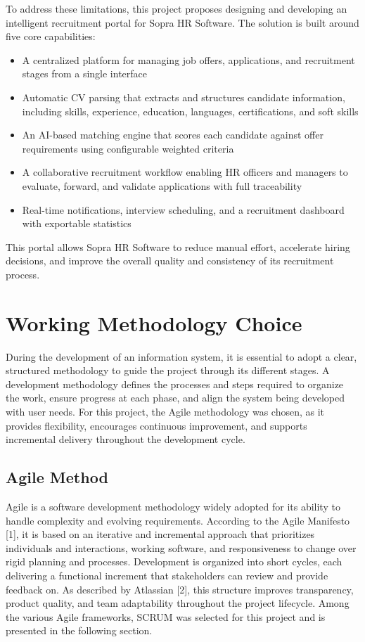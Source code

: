 To address these limitations, this project proposes designing and developing an intelligent recruitment portal for Sopra HR Software. The solution is built around five core capabilities:

\begin{itemize}[label={-}]
  \item A centralized platform for managing job offers, applications, and recruitment stages from a single interface
  \item Automatic CV parsing that extracts and structures candidate information, including skills, experience, education, languages, certifications, and soft skills
  \item An AI-based matching engine that scores each candidate against offer requirements using configurable weighted criteria
  \item A collaborative recruitment workflow enabling HR officers and managers to evaluate, forward, and validate applications with full traceability
  \item Real-time notifications, interview scheduling, and a recruitment dashboard with exportable statistics
\end{itemize}

This portal allows Sopra HR Software to reduce manual effort, accelerate hiring decisions, and improve the overall quality and consistency of its recruitment process.

\section{Working Methodology Choice}

During the development of an information system, it is essential to adopt a clear, structured methodology to guide the project through its different stages. A development methodology defines the processes and steps required to organize the work, ensure progress at each phase, and align the system being developed with user needs. For this project, the Agile methodology was chosen, as it provides flexibility, encourages continuous improvement, and supports incremental delivery throughout the development cycle.

\subsection{Agile Method}

Agile is a software development methodology widely adopted for its ability to handle complexity and evolving requirements. According to the Agile Manifesto [1], it is based on an iterative and incremental approach that prioritizes individuals and interactions, working software, and responsiveness to change over rigid planning and processes. Development is organized into short cycles, each delivering a functional increment that stakeholders can review and provide feedback on. As described by Atlassian [2], this structure improves transparency, product quality, and team adaptability throughout the project lifecycle. Among the various Agile frameworks, SCRUM was selected for this project and is presented in the following section.

